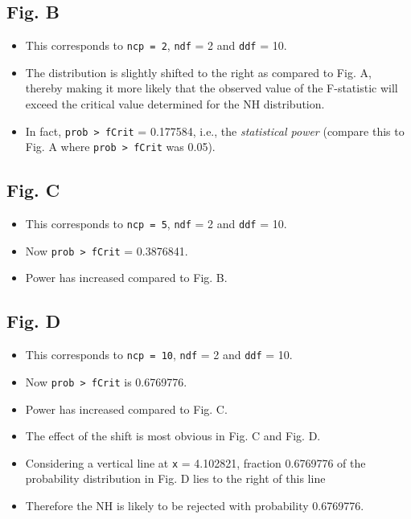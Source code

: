 \documentclass[]{book}
\providecommand{\tightlist}{%
  \setlength{\itemsep}{0pt}\setlength{\parskip}{0pt}}
\begin{document}
\hypertarget{fig.-b}{%
\subsection{Fig. B}\label{fig.-b}}

\begin{itemize}
\tightlist
\item
  This corresponds to \texttt{ncp\ =\ 2}, \texttt{ndf} = 2 and \texttt{ddf} = 10.
\item
  The distribution is slightly shifted to the right as compared to Fig. A, thereby making it more likely that the observed value of the F-statistic will exceed the critical value determined for the NH distribution.
\item
  In fact, \texttt{prob\ \textgreater{}\ fCrit} = 0.177584, i.e., the \emph{statistical power} (compare this to Fig. A where \texttt{prob\ \textgreater{}\ fCrit} was 0.05).
\end{itemize}

\hypertarget{fig.-c}{%
\subsection{Fig. C}\label{fig.-c}}

\begin{itemize}
\tightlist
\item
  This corresponds to \texttt{ncp\ =\ 5}, \texttt{ndf} = 2 and \texttt{ddf} = 10.
\item
  Now \texttt{prob\ \textgreater{}\ fCrit} = 0.3876841.
\item
  Power has increased compared to Fig. B.
\end{itemize}

\hypertarget{fig.-d}{%
\subsection{Fig. D}\label{fig.-d}}

\begin{itemize}
\tightlist
\item
  This corresponds to \texttt{ncp\ =\ 10}, \texttt{ndf} = 2 and \texttt{ddf} = 10.
\item
  Now \texttt{prob\ \textgreater{}\ fCrit} is 0.6769776.
\item
  Power has increased compared to Fig. C.
\item
  The effect of the shift is most obvious in Fig. C and Fig. D.
\item
  Considering a vertical line at \texttt{x} = 4.102821, fraction 0.6769776 of the probability distribution in Fig. D lies to the right of this line
\item
  Therefore the NH is likely to be rejected with probability 0.6769776.
\end{itemize}
\end{document}
